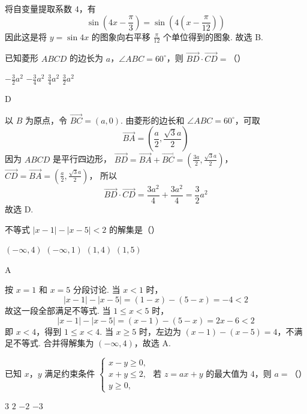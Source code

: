 \begin{solution}
将自变量提取系数 \(4\)，有
\[
\sin\left(4x-\frac{\pi}{3}\right)
=\sin\left(4\left(x-\frac{\pi}{12}\right)\right)
\]
因此这是将 \(y=\sin4x\) 的图象向右平移 \(\frac{\pi}{12}\) 个单位得到的图象. 故选 B.
\end{solution}

\begin{problem}
已知菱形 \(ABCD\) 的边长为 \(a\)，\(\angle ABC = 60^{\circ}\)，则 \(\overrightarrow{BD} \cdot \overrightarrow{CD} =\)（\quad）

\choices
    {\(-\frac{3}{2}a^2\)}
    {\(-\frac{3}{4}a^2\)}
    {\(\frac{3}{4}a^2\)}
    {\(\frac{3}{2}a^2\)}
\end{problem}

\begin{answer}
D
\end{answer}

\begin{solution}
以 \(B\) 为原点，令 \(\overrightarrow{BC}=(a,0)\). 由菱形的边长和
\(\angle ABC=60^\circ\)，可取
\[
\overrightarrow{BA}=\left(\frac a2,\frac{\sqrt3a}{2}\right)
\]
因为 \(ABCD\) 是平行四边形，
\(\overrightarrow{BD}=\overrightarrow{BA}+\overrightarrow{BC} =\left(\frac{3a}{2},\frac{\sqrt3a}{2}\right)\)，\(\overrightarrow{CD}=\overrightarrow{BA} =\left(\frac a2,\frac{\sqrt3a}{2}\right)\)，
所以
\[
\overrightarrow{BD}\cdot\overrightarrow{CD}
=\frac{3a^2}{4}+\frac{3a^2}{4}=\frac32a^2
\]
故选 D.
\end{solution}

\begin{problem}
不等式 \(|x - 1| - |x - 5| < 2\) 的解集是（\quad）

\choices
    {\((-\infty,4)\)}
    {\((-\infty,1)\)}
    {\((1,4)\)}
    {\((1,5)\)}
\end{problem}

\begin{answer}
A
\end{answer}

\begin{solution}
按 \(x=1\) 和 \(x=5\) 分段讨论.
当 \(x<1\) 时，
\[
|x-1|-|x-5|=(1-x)-(5-x)=-4<2
\]
故这一段全部满足不等式.
当 \(1\leqslant x<5\) 时，
\[
|x-1|-|x-5|=(x-1)-(5-x)=2x-6<2
\]
即 \(x<4\)，得到 \(1\leqslant x<4\).
当 \(x\geqslant5\) 时，左边为 \((x-1)-(x-5)=4\)，不满足不等式.
合并得解集为 \((-\infty,4)\)，故选 A.
\end{solution}

\begin{problem}
已知 \(x\)，\(y\) 满足约束条件 \(\begin{cases}
x - y \geqslant 0,\\
x + y \leqslant 2,\\
y \geqslant 0,
\end{cases}\) 若 \(z = ax + y\) 的最大值为 \(4\)，则 \(a =\)（\quad）

\choices
    {\(3\)}
    {\(2\)}
    {\(-2\)}
    {\(-3\)}
\end{problem}

